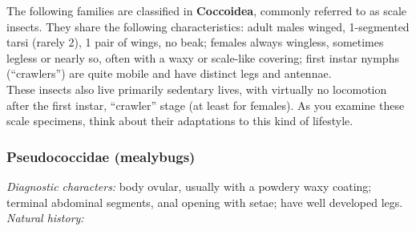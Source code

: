 \documentclass[letterpaper, 11pt]{article}
\begin{document}
\noindent{}The following families are classified in \textbf{Coccoidea}, commonly referred to as scale insects. They share the following characteristics: adult males winged, 1-segmented tarsi (rarely 2), 1 pair of wings, no beak; females always wingless, sometimes legless or nearly so, often with a waxy or scale-like covering; first instar nymphs (``crawlers'') are quite mobile and have distinct legs and antennae.\\

\noindent{}These insects also live primarily sedentary lives, with virtually no locomotion after the first instar, ``crawler'' stage (at least for females). As you examine these scale specimens, think about their adaptations to this kind of lifestyle. \\

\subsubsection{Pseudococcidae (mealybugs)}
\noindent{}\textit{Diagnostic characters:} body ovular, usually with a powdery waxy coating; terminal abdominal segments, anal opening with setae; have well developed legs.\\%

\noindent{}\textit{Natural history:} \\
\end{document}
